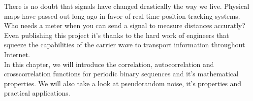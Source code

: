 There is no doubt that signals have changed drastically the way we live.
Physical maps have passed out long ago in favor of real-time position tracking
systems. Who needs a meter when you can send a signal to measure distances
accuratly? Even publishing this project it's thanks to the hard work of
engineers that squeeze the capabilities of the carrier wave to transport
information throughout Internet. \\

In this chapter, we will introduce the correlation, autocorrelation and
crosscorrelation functions for periodic binary sequences and it's mathematical
properties. We will also take a look at pseudorandom noise, it's properties and
practical applications.


